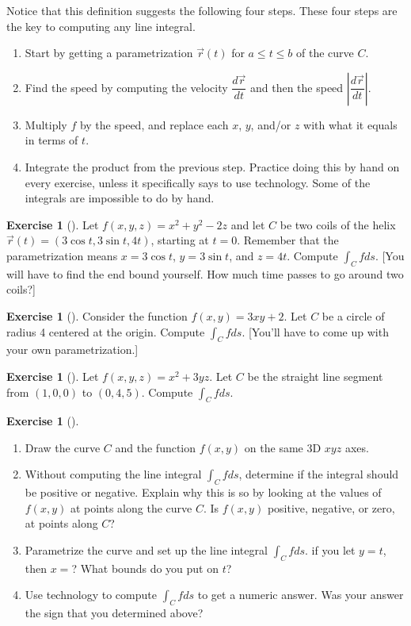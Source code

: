 \documentclass[10pt,]{book}
\theoremstyle{plain}
\theoremstyle{definition}
\theoremstyle{definition}
\theoremstyle{definition}
\theoremstyle{definition}
\newtheorem{exploration}[project]{Exercise}
\theoremstyle{definition}
\numberwithin{equation}{section}
\begin{document}
Notice that this definition suggests the following four steps. These four steps are the key to computing any line integral.  \leavevmode%
\begin{enumerate}
\item\hypertarget{li-139}{}Start by getting a parametrization \(\vec r(t)\) for \(a\leq t\leq b\) of the curve \(C\).%
\item\hypertarget{li-140}{}Find the speed by computing the velocity \(\dfrac{d\vec r}{dt}\) and then the speed \(\left|\dfrac{d\vec r}{dt}\right|\).%
\item\hypertarget{li-141}{}Multiply \(f\) by the speed, and replace each \(x\), \(y\), and/or \(z\) with what it equals in terms of \(t\).%
\item\hypertarget{li-142}{}Integrate the product from the previous step. Practice doing this by hand on every exercise, unless it specifically says to use technology. Some of the integrals are impossible to do by hand.%
\end{enumerate}
%
\begin{exploration}[]\label{exploration-197}
Let \(f(x,y,z)=x^2+y^2-2z\) and let \(C\) be two coils of the helix \(\vec r(t)=(3\cos t, 3\sin t, 4t)\), starting at \(t=0\). Remember that the parametrization means \(x=3\cos t\), \(y=3\sin t\), and \(z=4t\). Compute \(\int_Cf ds\). [You will have to find the end bound yourself. How much time passes to go around two coils?]%
\end{exploration}
\begin{exploration}[]\label{exploration-198}
Consider the function \(f(x,y)=3xy+2\). Let \(C\) be a circle of radius 4 centered at the origin. Compute \(\int_C fds\). [You'll have to come up with your own parametrization.]%
\end{exploration}
\begin{exploration}[]\label{exploration-199}
Let \(f(x,y,z)=x^2+3yz\). Let \(C\) be the straight line segment from \((1,0,0)\) to \((0,4,5)\). Compute \(\int_C f ds\).%
\end{exploration}
\begin{exploration}[]\label{exploration-200}
\leavevmode%
\begin{enumerate}[font=\bfseries,label=(\alph*),ref=\alph*]
\item\label{task-504} Draw the curve \(C\) and the function \(f(x,y)\) on the same 3D \(xyz\) axes.%
\item\label{task-505} Without computing the line integral \(\int_C fds\), determine if the integral should be positive or negative. Explain why this is so by looking at the values of \(f(x,y)\) at points along the curve \(C\).  Is \(f(x,y)\) positive, negative, or zero, at points along \(C\)?%
\item\label{task-506} Parametrize the curve and set up the line integral \(\int_C f ds\). if you let \(y=t\), then \(x=\)? What bounds do you put on \(t\)?%
%
\item\label{task-507} Use technology to compute \(\int_C fds\) to get a numeric answer.  Was your answer the sign that you determined above?%
\end{enumerate}
\end{exploration}
\end{document}
